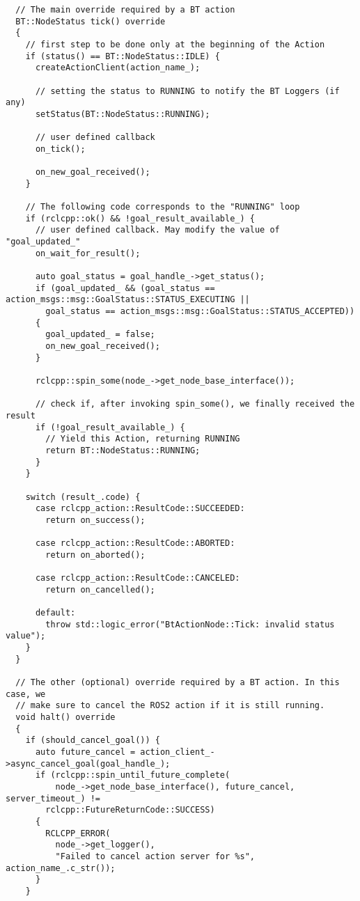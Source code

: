 \begin{tcolorbox}[sharp corners, colframe=gray!80, colback=LightGray, left=0pt, top=0pt, bottom=0pt, title=\texttt{br2\_bt\_patrolling/include/br2\_bt\_patrolling/ctrl\_support/BTActionNode.hpp}]
\begin{verbatim}
  // The main override required by a BT action
  BT::NodeStatus tick() override
  {
    // first step to be done only at the beginning of the Action
    if (status() == BT::NodeStatus::IDLE) {
      createActionClient(action_name_);

      // setting the status to RUNNING to notify the BT Loggers (if any)
      setStatus(BT::NodeStatus::RUNNING);

      // user defined callback
      on_tick();

      on_new_goal_received();
    }

    // The following code corresponds to the "RUNNING" loop
    if (rclcpp::ok() && !goal_result_available_) {
      // user defined callback. May modify the value of "goal_updated_"
      on_wait_for_result();

      auto goal_status = goal_handle_->get_status();
      if (goal_updated_ && (goal_status == action_msgs::msg::GoalStatus::STATUS_EXECUTING ||
        goal_status == action_msgs::msg::GoalStatus::STATUS_ACCEPTED))
      {
        goal_updated_ = false;
        on_new_goal_received();
      }

      rclcpp::spin_some(node_->get_node_base_interface());

      // check if, after invoking spin_some(), we finally received the result
      if (!goal_result_available_) {
        // Yield this Action, returning RUNNING
        return BT::NodeStatus::RUNNING;
      }
    }

    switch (result_.code) {
      case rclcpp_action::ResultCode::SUCCEEDED:
        return on_success();

      case rclcpp_action::ResultCode::ABORTED:
        return on_aborted();

      case rclcpp_action::ResultCode::CANCELED:
        return on_cancelled();

      default:
        throw std::logic_error("BtActionNode::Tick: invalid status value");
    }
  }

  // The other (optional) override required by a BT action. In this case, we
  // make sure to cancel the ROS2 action if it is still running.
  void halt() override
  {
    if (should_cancel_goal()) {
      auto future_cancel = action_client_->async_cancel_goal(goal_handle_);
      if (rclcpp::spin_until_future_complete(
          node_->get_node_base_interface(), future_cancel, server_timeout_) !=
        rclcpp::FutureReturnCode::SUCCESS)
      {
        RCLCPP_ERROR(
          node_->get_logger(),
          "Failed to cancel action server for %s", action_name_.c_str());
      }
    }


\end{verbatim}
\end{tcolorbox}
